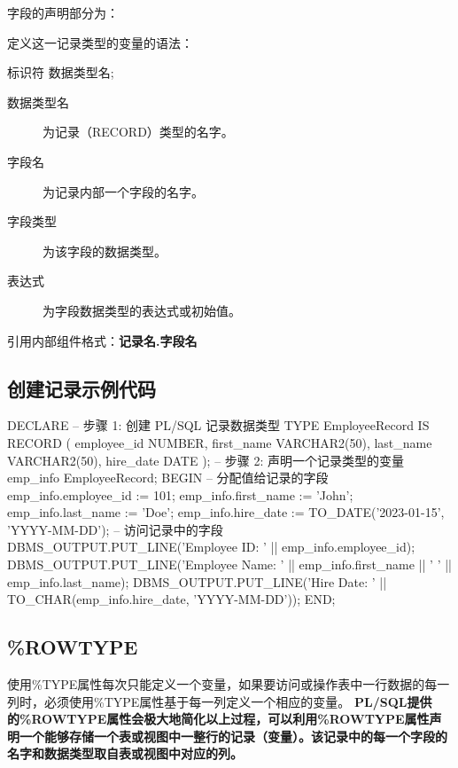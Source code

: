 \documentclass[11pt, a4paper, oneside, UTF8]{ctexbook}
\let\kaishu\relax %
\begin{document}
字段的声明部分为：

定义这一记录类型的变量的语法：
\begin{plsql}[caption=定义变量]
  标识符 数据类型名;
\end{plsql}

\begin{description}
  \item[数据类型名] 为记录（RECORD）类型的名字。
  \item[字段名] 为记录内部一个字段的名字。
  \item[字段类型] 为该字段的数据类型。
  \item[表达式] 为字段数据类型的表达式或初始值。
\end{description}

引用内部组件格式：{\bfseries\kaishu 记录名.字段名}

\subsection{创建记录示例代码}

\begin{plsql}[caption=使用记录类型变量示例]
DECLARE
  -- 步骤 1: 创建 PL/SQL 记录数据类型
  TYPE EmployeeRecord IS RECORD (
    employee_id NUMBER,
    first_name VARCHAR2(50),
    last_name VARCHAR2(50),
    hire_date DATE
  );
  -- 步骤 2: 声明一个记录类型的变量
  emp_info EmployeeRecord;
BEGIN
  -- 分配值给记录的字段
  emp_info.employee_id := 101;
  emp_info.first_name := 'John';
  emp_info.last_name := 'Doe';
  emp_info.hire_date := TO_DATE('2023-01-15', 'YYYY-MM-DD');
  -- 访问记录中的字段
  DBMS_OUTPUT.PUT_LINE('Employee ID: ' || emp_info.employee_id);
  DBMS_OUTPUT.PUT_LINE('Employee Name: ' || emp_info.first_name || ' ' || emp_info.last_name);
  DBMS_OUTPUT.PUT_LINE('Hire Date: ' || TO_CHAR(emp_info.hire_date, 'YYYY-MM-DD'));
END;
\end{plsql}

\subsection{\%ROWTYPE}
使用\%TYPE属性每次只能定义一个变量，如果要访问或操作表中一行数据的每一列时，必须使用\%TYPE属性基于每一列定义一个相应的变量。
{\bfseries\kaishu PL/SQL提供的\%ROWTYPE属性会极大地简化以上过程，可以利用\%ROWTYPE属性声明一个能够存储一个表或视图中一整行的记录（变量）。该记录中的每一个字段的名字和数据类型取自表或视图中对应的列。}
\end{document}
